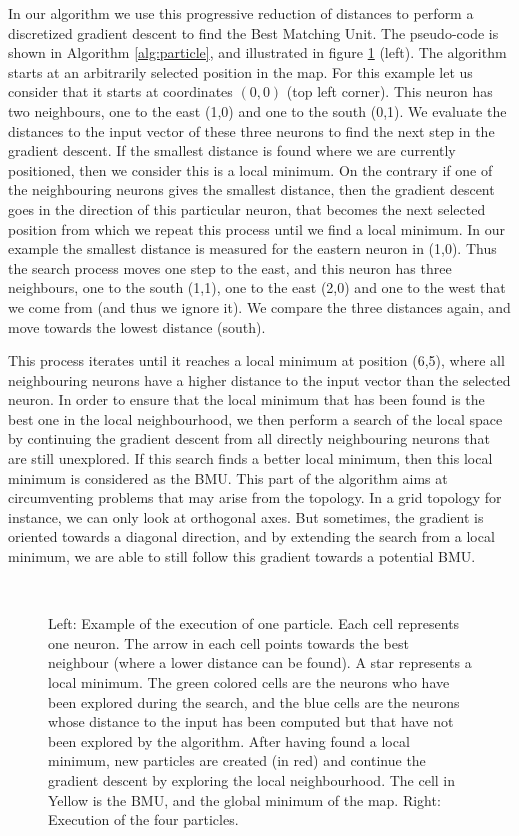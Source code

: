 	In our algorithm we use this progressive reduction of distances to perform a discretized gradient descent to find the Best Matching Unit. The pseudo-code is shown in Algorithm \ref{alg:particle}, and illustrated in figure \ref{fig:first_particle} (left). The algorithm starts at an arbitrarily selected position in the map. For this example let us consider that it starts at coordinates $(0,0)$ (top left corner). This neuron has two neighbours, one to the east (1,0) and one to the south (0,1). We evaluate the distances to the input vector of these three neurons to find the next step in the gradient descent. If the smallest distance is found where we are currently positioned, then we consider this is a local minimum. On the contrary if one of the neighbouring neurons gives the smallest distance, then the gradient descent goes in the direction of this particular neuron, that becomes the next selected position from which we repeat this process until we find a local minimum. In our example the smallest distance is measured for the eastern neuron in (1,0). Thus the search process moves one step to the east, and this neuron has three neighbours, one to the south (1,1), one to the east (2,0) and one to the west that we come from (and thus we ignore it). We compare the three distances again, and move towards the lowest distance (south).

	This process iterates until it reaches a local minimum at position (6,5), where all neighbouring neurons have a higher distance to the input vector than the selected neuron. In order to ensure that the local minimum that has been found is the best one in the local neighbourhood, we then perform a search of the local space by continuing the gradient descent from all directly neighbouring neurons that are still unexplored. If this search finds a better local minimum, then this local minimum is considered as the BMU. This part of the algorithm aims at circumventing problems that may arise from the topology. In a grid topology for instance, we can only look at orthogonal axes. But sometimes, the gradient is oriented towards a diagonal direction, and by extending the search from a local minimum, we are able to still follow this gradient towards a potential BMU.

	\begin{figure}[!t]
    	\centering
    	\ \ \ \ \ \ \ 
    	
    	\caption{Left: Example of the execution of one particle. Each cell represents one neuron. The arrow in each cell points towards the best neighbour (where a lower distance can be found). A star represents a local minimum. The green colored cells are the neurons who have been explored during the search, and the blue cells are the neurons whose distance to the input has been computed but that have not been explored by the algorithm. After having found a local minimum, new particles are created (in red) and continue the gradient descent by exploring the local neighbourhood. The cell in Yellow is the BMU, and the global minimum of the map. Right: Execution of the four particles.}
    	\label{fig:first_particle}
	\end{figure}

